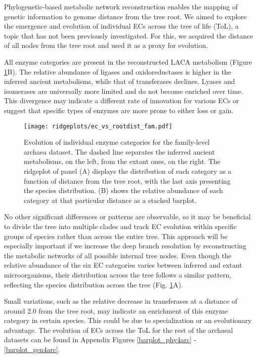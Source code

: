 Phylogenetic-based metabolic network reconstruction enables the mapping of genetic information to genome distance from the tree root. We aimed to explore the emergence and evolution of individual ECs across the tree of life (ToL), a topic that has not been previously investigated. For this, we acquired the distance of all nodes from the tree root and used it as a proxy for evolution.

All enzyme categories are present in the reconstructed LACA metabolism (Figure \ref{ec_vs_rootdist_fam}B). The relative abundance of ligases and oxidoreductases is higher in the inferred ancient metabolisms, while that of transferases declines. Lyases and isomerases are universally more limited and do not become enriched over time. This divergence may indicate a different rate of innovation for various ECs or suggest that specific types of enzymes are more prone to either loss or gain.

\begin{figure}[H]
    \centering
    \texttt{[image: ridgeplots/ec\_vs\_rootdist\_fam.pdf]}
    \caption{Evolution of individual enzyme categories for the family-level archaea dataset. The dashed line separates the inferred ancient metabolisms, on the left, from the extant ones, on the right. The ridgeplot of panel (A) displays the distribution of each category as a function of distance from the tree root, with the last axis presenting the species distribution. (B) shows the relative abundance of each category at that particular distance as a stacked barplot.}
    \label{ec_vs_rootdist_fam}
\end{figure}  

No other significant differences or patterns are observable, so it may be beneficial to divide the tree into multiple clades and track EC evolution within specific groups of species rather than across the entire tree. This approach will be especially important if we increase the deep branch resolution by reconstructing the metabolic networks of all possible internal tree nodes. Even though the relative abundance of the six EC categories varies between inferred and extant microorganisms, their distribution across the tree follows a similar pattern, reflecting the species distribution across the tree (Fig. \ref{ec_vs_rootdist_fam}A). 

Small variations, such as the relative decrease in transferases at a distance of around 2.0 from the tree root, may indicate an enrichment of this enzyme category in certain species. This could be due to specialization or an evolutionary advantage. The evolution of ECs across the ToL for the rest of the archaeal datasets can be found in Appendix Figures \ref{barplot_phy4arc} - \ref{barplot_gen4arc}.



